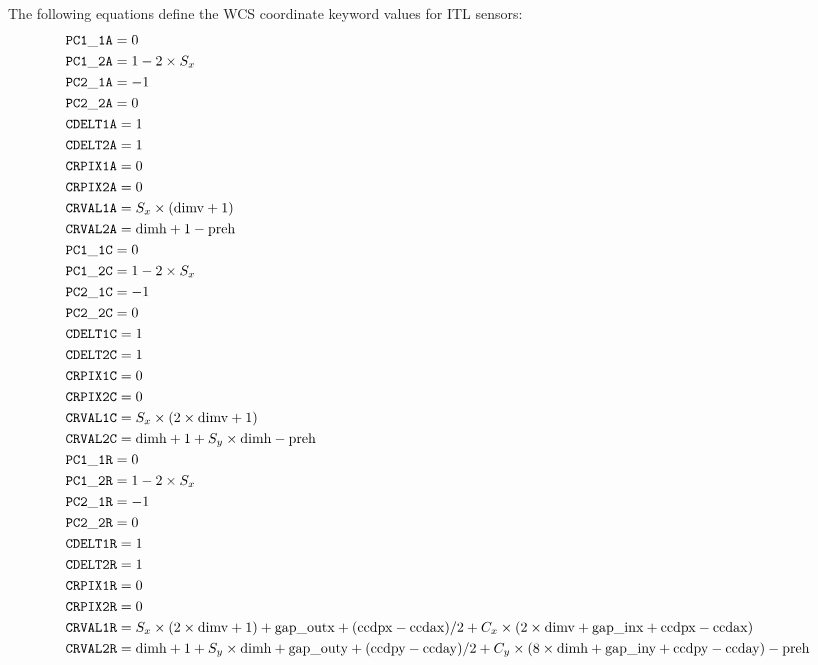 \documentclass{article}[12pt]
\begin{document}
The following equations define the WCS coordinate keyword values for ITL sensors:
\begin{align*}
& {\tt PC1\_1A} = 0 \\
& {\tt PC1\_2A} = 1 - 2 \times S_x \\
& {\tt PC2\_1A} = -1 \\
& {\tt PC2\_2A} = 0 \\
& {\tt CDELT1A} = 1 \\
& {\tt CDELT2A} = 1 \\
& {\tt CRPIX1A} = 0 \\
& {\tt CRPIX2A} = 0 \\
& {\tt CRVAL1A} = S_x \times({\rm dimv} + 1) \\
& {\tt CRVAL2A} = {\rm dimh} + 1 - {\rm preh} \\
& {\tt PC1\_1C} = 0 \\
& {\tt PC1\_2C} = 1 - 2 \times S_x \\
& {\tt PC2\_1C} = -1 \\
& {\tt PC2\_2C} = 0 \\
& {\tt CDELT1C} = 1 \\
& {\tt CDELT2C} = 1 \\
& {\tt CRPIX1C} = 0 \\
& {\tt CRPIX2C} = 0 \\
& {\tt CRVAL1C} = S_x \times(2 \times {\rm dimv} + 1) \\
& {\tt CRVAL2C} = {\rm dimh} + 1 + S_y \times {\rm dimh} - {\rm preh} \\
& {\tt PC1\_1R} = 0 \\
& {\tt PC1\_2R} = 1 - 2 \times S_x \\
& {\tt PC2\_1R} = -1 \\
& {\tt PC2\_2R} = 0 \\
& {\tt CDELT1R} = 1 \\
& {\tt CDELT2R} = 1 \\
& {\tt CRPIX1R} = 0 \\
& {\tt CRPIX2R} = 0 \\
& {\tt CRVAL1R} = S_x \times(2 \times {\rm dimv} + 1) + {\rm gap\_outx} + ({\rm ccdpx} - {\rm ccdax})/2 + C_x \times (2 \times {\rm dimv} + {\rm gap\_inx} + {\rm ccdpx} - {\rm ccdax}) \\
& {\tt CRVAL2R} = {\rm dimh} + 1 + S_y \times {\rm dimh} + {\rm gap\_outy} + ({\rm ccdpy} - {\rm ccday})/2 + C_y \times ( 8 \times {\rm dimh} + {\rm gap\_iny} + {\rm ccdpy} - {\rm ccday}) - {\rm preh} \\

\end{align*}
\end{document}
